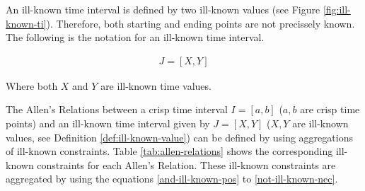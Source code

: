 An ill-known time interval is defined by two ill-known values (see Figure \ref{fig:ill-known-ti}). Therefore, both starting and ending points are not precissely known. The following is the notation for an ill-known time interval.

\begin{align}
\label{eq:ill-known-time-interval}
J = \left[X, Y \right] 
\end{align}

Where both $X$ and $Y$ are ill-known time values.


The Allen's Relations between a crisp time interval $I = [a,b]$ ($a, b$ are crisp time points) and an ill-known time interval given by $J = [X,Y]$ ($X, Y$ are ill-known values, see Definition \ref{def:ill-known-value}) can be defined by using aggregations of ill-known constraints. Table \ref{tab:allen-relations} shows the corresponding ill-known constraints for each Allen's Relation. These ill-known constraints are aggregated by using the equations \eqref{and-ill-known-pos} to \eqref{not-ill-known-nec}.



